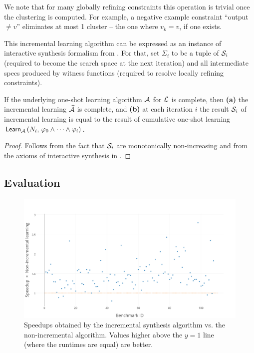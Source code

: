 \begin{itemize}
        We note that for many globally refining constraints this operation is trivial once the clustering is computed.
        For example, a negative example constraint ``output $\ne v$'' eliminates at most 1 cluster -- the one where $v_k
        = v$, if one exists.
\end{itemize}

This incremental learning algorithm can be expressed as an instance of interactive synthesis formalism from
.
For that, set $\Sigma_i$ to be a tuple of $\mathcal{S}_i$ (required to become the search space at the next
iteration) and all intermediate specs produced by witness functions (required to resolve locally refining constraints).

\begin{theorem}
    If the underlying one-shot learning algorithm $\mathcal{A}$ for $\mathcal{L}$ is complete, then
    \textbf{(a)} the incremental learning $\widehat{\mathcal{A}}$ is complete, and
    \textbf{(b)} at each iteration $i$ the result $\mathcal{S}_i$ of incremental learning is equal to the result of
    cumulative one-shot learning $\mathsf{Learn}_{\mathcal{A}}\left(N_i,\, \varphi_0 \wedge \dots \wedge
    \varphi_i\right)$.
    \label{th:incremental:complete}
\end{theorem}
\begin{proof}
    Follows from the fact that $\mathcal{S}_i$ are monotonically non-increasing and from the axioms of interactive
    synthesis in .
\end{proof}

\subsection{Evaluation}

\begin{figure}[t]
    \centering
    \includegraphics[width=0.99\linewidth]{figures/incremental-learning-performance}
    \caption{Speedups obtained by the incremental synthesis algorithm vs. the non-incremental algorithm.
        Values higher above the $y=1$ line (where the runtimes are equal) are better.}
    \label{fig:interactive:incremental:speedup}
\end{figure}


